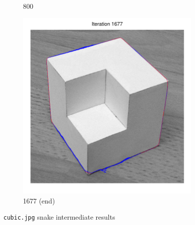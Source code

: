 \documentclass[11pt,a4paper]{article}
\begin{document}
\begin{figure}[H]
\begin{subfigure}[t]{0.48\textwidth}
        \caption{800}
        \label{fig:cubic_800}
    \end{subfigure}
    \begin{subfigure}[t]{0.48\textwidth}
        \includegraphics[width=\textwidth]{src/images/cubic_1677.pdf}
        \caption{1677 (end)}
        \label{fig:cubic_end}
    \end{subfigure}
    \caption{\texttt{cubic.jpg} snake intermediate results}
    \label{fig:cubic_intermediate}
\end{figure}
\end{document}
